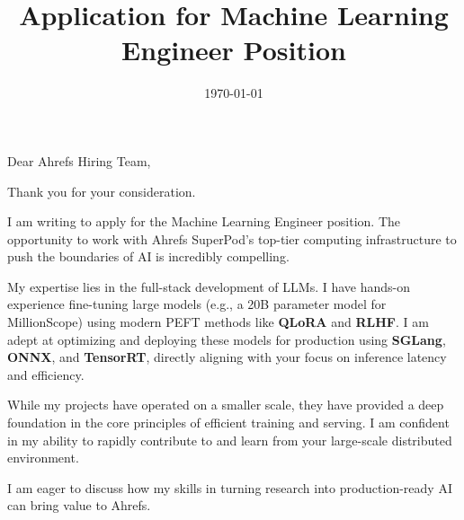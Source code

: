 \documentclass[11pt,a4paper,roman]{moderncv}
\title{Application for Machine Learning Engineer Position}
\begin{document}
	
	\date{\today}
	\opening{Dear Ahrefs Hiring Team,}
	\closing{Thank you for your consideration.}
	\makelettertitle
	
I am writing to apply for the Machine Learning Engineer position. The opportunity to work with Ahrefs SuperPod's top-tier computing infrastructure to push the boundaries of AI is incredibly compelling.

My expertise lies in the full-stack development of LLMs. I have hands-on experience fine-tuning large models (e.g., a 20B parameter model for MillionScope) using modern PEFT methods like \textbf{QLoRA} and \textbf{RLHF}. I am adept at optimizing and deploying these models for production using \textbf{SGLang}, \textbf{ONNX}, and \textbf{TensorRT}, directly aligning with your focus on inference latency and efficiency.

While my projects have operated on a smaller scale, they have provided a deep foundation in the core principles of efficient training and serving. I am confident in my ability to rapidly contribute to and learn from your large-scale distributed environment.

I am eager to discuss how my skills in turning research into production-ready AI can bring value to Ahrefs.


	
	
	\makeletterclosing
	
\end{document}

